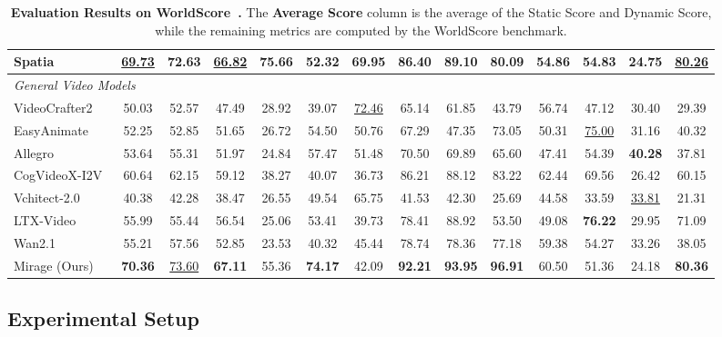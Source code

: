 \documentclass{llmxive}
\providecommand{\method}{Mirage\xspace}
\begin{document}
\begin{table}
{\begin{tabular}{l|ccc|ccc|cccc|ccc}
        Spatia~\cite{zhao2026spatia}                 & \underline{69.73} & 72.63 & \underline{66.82} & 75.66 & 52.32 & 69.95 & 86.40 & 89.10 & 80.09 & 54.86 & 54.83 & 24.75 & \underline{80.26} \\
        \midrule
        \multicolumn{14}{l}{\textit{General Video Models}} \\
        VideoCrafter2~\cite{chen2024videocrafter2}   & 50.03 & 52.57 & 47.49 & 28.92 & 39.07 & \underline{72.46} & 65.14 & 61.85 & 43.79 & 56.74 & 47.12 & 30.40 & 29.39 \\
        EasyAnimate~\cite{xu2024easyanimate}         & 52.25 & 52.85 & 51.65 & 26.72 & 54.50 & 50.76 & 67.29 & 47.35 & 73.05 & 50.31 & \underline{75.00} & 31.16 & 40.32 \\
        Allegro~\cite{allegro2024}                   & 53.64 & 55.31 & 51.97 & 24.84 & 57.47 & 51.48 & 70.50 & 69.89 & 65.60 & 47.41 & 54.39 & \textbf{40.28} & 37.81 \\
        CogVideoX-I2V~\cite{yang2024cogvideox}       & 60.64 & 62.15 & 59.12 & 38.27 & 40.07 & 36.73 & 86.21 & 88.12 & 83.22 & 62.44 & 69.56 & 26.42 & 60.15 \\
        Vchitect-2.0~\cite{fan2025vchitect}          & 40.38 & 42.28 & 38.47 & 26.55 & 49.54 & 65.75 & 41.53 & 42.30 & 25.69 & 44.58 & 33.59 & \underline{33.81} & 21.31 \\
        LTX-Video~\cite{hacohen2024ltx}              & 55.99 & 55.44 & 56.54 & 25.06 & 53.41 & 39.73 & 78.41 & 88.92 & 53.50 & 49.08 & \textbf{76.22} & 29.95 & 71.09 \\
        Wan2.1~\cite{wan2025wan}                     & 55.21 & 57.56 & 52.85 & 23.53 & 40.32 & 45.44 & 78.74 & 78.36 & 77.18 & 59.38 & 54.27 & 33.26 & 38.05 \\
        \midrule
        \method{} (Ours)                             & \textbf{70.36} & \underline{73.60} & \textbf{67.11} & 55.36 & \textbf{74.17} & 42.09 & \textbf{92.21} & \textbf{93.95} & \textbf{96.91} & 60.50 & 51.36 & 24.18 & \textbf{80.36} \\
        \bottomrule
        \end{tabular}%
    }
    \label{tab:world-score}
\caption{
    \textbf{Evaluation Results on WorldScore~\cite{worldscore}.}
    The \textbf{Average Score} column is the average of the Static Score and Dynamic Score, while the remaining metrics are computed by the WorldScore benchmark.
    }
\end{table}

\subsection{Experimental Setup}
\label{sec:exp:setup}
\end{document}
